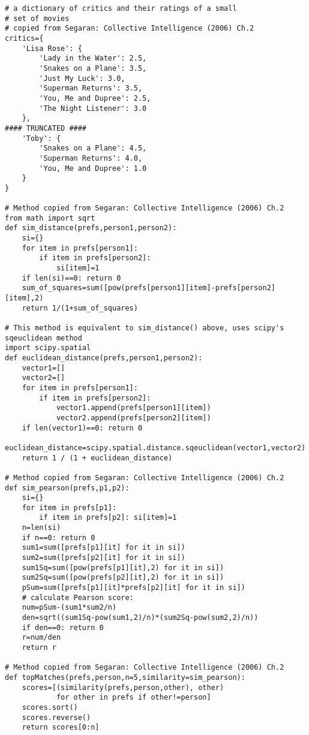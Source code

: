 \begin{verbatim}
# a dictionary of critics and their ratings of a small
# set of movies
# copied from Segaran: Collective Intelligence (2006) Ch.2
critics={
    'Lisa Rose': {
        'Lady in the Water': 2.5,
        'Snakes on a Plane': 3.5,
        'Just My Luck': 3.0,
        'Superman Returns': 3.5,
        'You, Me and Dupree': 2.5,
        'The Night Listener': 3.0
    },
#### TRUNCATED ####
    'Toby': {
        'Snakes on a Plane': 4.5,
        'Superman Returns': 4.0,
        'You, Me and Dupree': 1.0
    }
}

# Method copied from Segaran: Collective Intelligence (2006) Ch.2
from math import sqrt
def sim_distance(prefs,person1,person2):
    si={}
    for item in prefs[person1]:
        if item in prefs[person2]:
            si[item]=1
    if len(si)==0: return 0
    sum_of_squares=sum([pow(prefs[person1][item]-prefs[person2][item],2)
    return 1/(1+sum_of_squares)

# This method is equivalent to sim_distance() above, uses scipy's sqeuclidean method
import scipy.spatial
def euclidean_distance(prefs,person1,person2):
    vector1=[]
    vector2=[]
    for item in prefs[person1]:
        if item in prefs[person2]:
            vector1.append(prefs[person1][item])
            vector2.append(prefs[person2][item])
    if len(vector1)==0: return 0
    euclidean_distance=scipy.spatial.distance.sqeuclidean(vector1,vector2)
    return 1 / (1 + euclidean_distance)

# Method copied from Segaran: Collective Intelligence (2006) Ch.2
def sim_pearson(prefs,p1,p2):
    si={}
    for item in prefs[p1]:
        if item in prefs[p2]: si[item]=1
    n=len(si)
    if n==0: return 0
    sum1=sum([prefs[p1][it] for it in si])
    sum2=sum([prefs[p2][it] for it in si])
    sum1Sq=sum([pow(prefs[p1][it],2) for it in si])
    sum2Sq=sum([pow(prefs[p2][it],2) for it in si])
    pSum=sum([prefs[p1][it]*prefs[p2][it] for it in si])
    # calculate Pearson score:
    num=pSum-(sum1*sum2/n)
    den=sqrt((sum1Sq-pow(sum1,2)/n)*(sum2Sq-pow(sum2,2)/n))
    if den==0: return 0
    r=num/den
    return r

# Method copied from Segaran: Collective Intelligence (2006) Ch.2
def topMatches(prefs,person,n=5,similarity=sim_pearson):
    scores=[(similarity(prefs,person,other), other)
            for other in prefs if other!=person]
    scores.sort()
    scores.reverse()
    return scores[0:n]


\end{verbatim}
